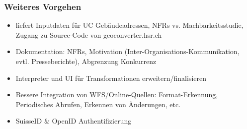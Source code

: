 \documentclass[class=scrbook,crop=false]{standalone}
\begin{document}
	\subsubsection*{Weiteres Vorgehen}
	\begin{itemize}
		\item \prof liefert Inputdaten für UC Gebäudeadressen, NFRs vs. Machbarkeitsstudie, Zugang zu Source-Code von geoconverter.hsr.ch
		\item Dokumentation: NFRs, Motivation (Inter-Organisations-Kommunikation, evtl. Presseberichte), Abgrenzung Konkurrenz
		\item Interpreter und UI für Transformationen erweitern/finalisieren
		\item Bessere Integration von WFS/Online-Quellen: Format-Erkennung, Periodisches Abrufen, Erkennen von Änderungen, etc.
		\item SuisseID \& OpenID Authentifizierung
	\end{itemize}
\end{document}
